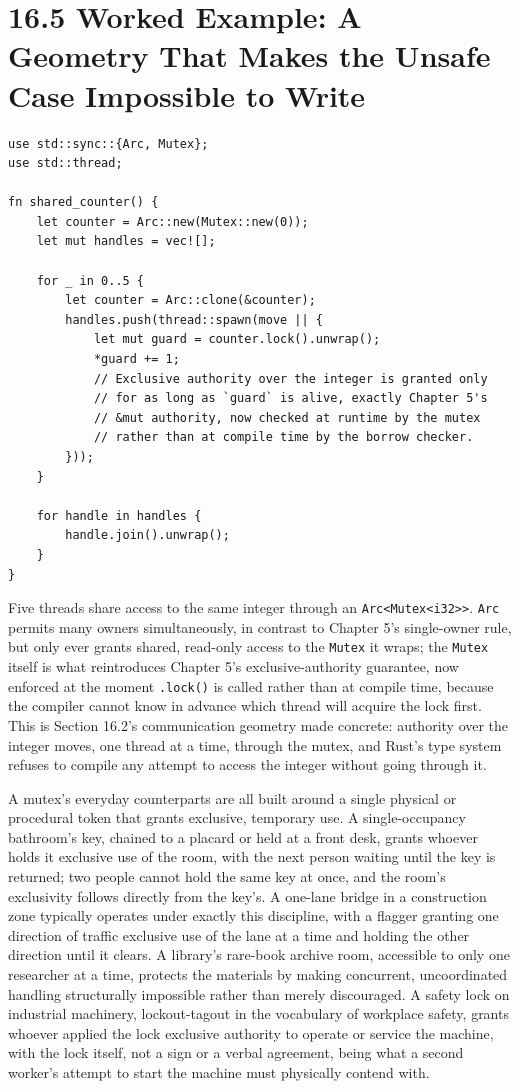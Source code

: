 \documentclass[11pt]{book}
\begin{document}
\section*{16.5 Worked Example: A Geometry That Makes the Unsafe Case Impossible to Write}

\begin{lstlisting}
use std::sync::{Arc, Mutex};
use std::thread;

fn shared_counter() {
    let counter = Arc::new(Mutex::new(0));
    let mut handles = vec![];

    for _ in 0..5 {
        let counter = Arc::clone(&counter);
        handles.push(thread::spawn(move || {
            let mut guard = counter.lock().unwrap();
            *guard += 1;
            // Exclusive authority over the integer is granted only
            // for as long as `guard` is alive, exactly Chapter 5's
            // &mut authority, now checked at runtime by the mutex
            // rather than at compile time by the borrow checker.
        }));
    }

    for handle in handles {
        handle.join().unwrap();
    }
}
\end{lstlisting}

Five threads share access to the same integer through an \texttt{Arc<Mutex<i32>>}. \texttt{Arc} permits many owners simultaneously, in contrast to Chapter 5's single-owner rule, but only ever grants shared, read-only access to the \texttt{Mutex} it wraps; the \texttt{Mutex} itself is what reintroduces Chapter 5's exclusive-authority guarantee, now enforced at the moment \texttt{.lock()} is called rather than at compile time, because the compiler cannot know in advance which thread will acquire the lock first. This is Section 16.2's communication geometry made concrete: authority over the integer moves, one thread at a time, through the mutex, and Rust's type system refuses to compile any attempt to access the integer without going through it.

A mutex's everyday counterparts are all built around a single physical or procedural token that grants exclusive, temporary use. A single-occupancy bathroom's key, chained to a placard or held at a front desk, grants whoever holds it exclusive use of the room, with the next person waiting until the key is returned; two people cannot hold the same key at once, and the room's exclusivity follows directly from the key's. A one-lane bridge in a construction zone typically operates under exactly this discipline, with a flagger granting one direction of traffic exclusive use of the lane at a time and holding the other direction until it clears. A library's rare-book archive room, accessible to only one researcher at a time, protects the materials by making concurrent, uncoordinated handling structurally impossible rather than merely discouraged. A safety lock on industrial machinery, lockout-tagout in the vocabulary of workplace safety, grants whoever applied the lock exclusive authority to operate or service the machine, with the lock itself, not a sign or a verbal agreement, being what a second worker's attempt to start the machine must physically contend with.
\end{document}
